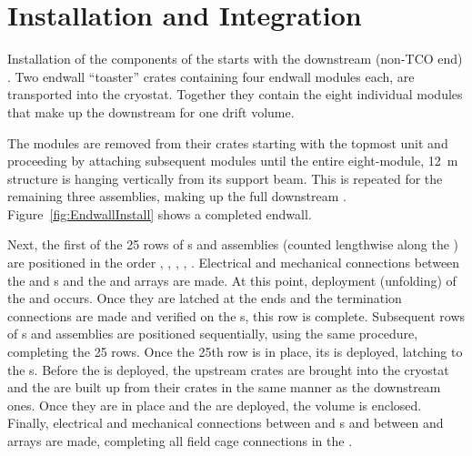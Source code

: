 \section{Installation and Integration}
\label{sec:fdsp-hv-transport-install}
Installation of the components of the  starts with the downstream (non-TCO end) .  Two endwall ``toaster'' crates   
containing four endwall modules each, are transported into the cryostat.  Together they contain the eight individual modules that make up the  
downstream  for one drift volume.   


The modules are removed from their crates starting with the topmost unit and proceeding by attaching subsequent modules until the entire eight-module, \SI{12}{m} structure
is hanging vertically from its support beam.  This is repeated for the remaining three assemblies, making up the full downstream . 
Figure~\ref{fig:EndwallInstall} shows a completed  endwall. 

Next, the first of the 25 rows of s and  assemblies (counted lengthwise along the ) are positioned in the order , , , , .  Electrical and mechanical connections between the  and s and the  and  arrays are made.  At this point, deployment (unfolding) of the  and  
occurs.  Once they 
are latched at the  ends and 
the  termination connections are made and verified on the s, this  row is complete.  Subsequent rows of s and  assemblies are positioned sequentially, using the same procedure, completing the 25 rows. 
Once the 25th row is in place, its  is deployed, latching to the s.  Before the  is deployed, the upstream  crates are brought into the cryostat 
and the  are built up from their crates in the same manner as the downstream ones.   
Once they  are in place and the  are deployed, the  volume is enclosed. 
Finally, electrical and mechanical connections between  and s and between  and  arrays are made, completing all field cage connections in the .


